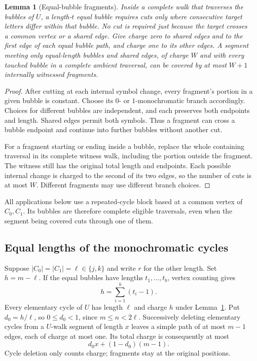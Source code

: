 \documentclass[11pt,letterpaper]{article}
\newtheorem{lemma}[theorem]{Lemma}
\theoremstyle{definition}
\theoremstyle{remark}
\begin{document}
\begin{lemma}[Equal-bubble fragments]\label{ccc:sc:lem:bubble-fragments}
Inside a complete walk that traverses the bubbles of $U$, a length-$t$ equal bubble requires cuts only where consecutive target letters differ within that bubble. No cut is required just because the target crosses a common vertex or a shared edge. Give charge zero to shared edges and to the first edge of each equal bubble path, and charge one to its other edges. A segment meeting only equal-length bubbles and shared edges, of charge $W$ and with every touched bubble in a complete ambient traversal, can be covered by at most $W+1$ internally witnessed fragments.
\end{lemma}
\begin{proof}
After cutting at each internal symbol change, every fragment's portion in a given bubble is constant. Choose its $0$- or $1$-monochromatic branch accordingly. Choices for different bubbles are independent, and each preserves both endpoints and length. Shared edges permit both symbols. Thus a fragment can cross a bubble endpoint and continue into further bubbles without another cut.

For a fragment starting or ending inside a bubble, replace the whole containing traversal in its complete witness walk, including the portion outside the fragment. The witness still has the original total length and endpoints. Each possible internal change is charged to the second of its two edges, so the number of cuts is at most $W$. Different fragments may use different branch choices.
\end{proof}

All applications below use a repeated-cycle block based at a common vertex of $C_0,C_1$. Its bubbles are therefore complete eligible traversals, even when the segment being covered cuts through one of them.

\subsection{Equal lengths of the monochromatic cycles}

Suppose $|C_0|=|C_1|=\ell\in\{j,k\}$ and write $r$ for the other length. Set $h=m-\ell$. If the equal bubbles have lengths $t_1,\ldots,t_b$, vertex counting gives
\[
 h=\sum_{i=1}^b(t_i-1).
\]
Every elementary cycle of $U$ has length $\ell$ and charge $h$ under Lemma~\ref{ccc:sc:lem:bubble-fragments}. Put $d_0=h/\ell$, so $0\le d_0<1$, since $m\le n<2\ell$. Successively deleting elementary cycles from a $U$-walk segment of length $x$ leaves a simple path of at most $m-1$ edges, each of charge at most one. Its total charge is consequently at most
\begin{equation}\label{ccc:sc:eq:equal-charge}
 d_0x+(1-d_0)(m-1).
\end{equation}
Cycle deletion only counts charge; fragments stay at the original positions.
\end{document}
